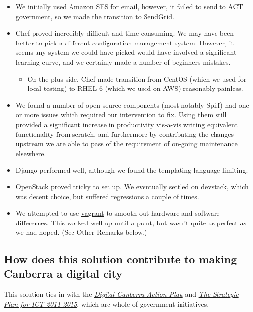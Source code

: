 \documentclass[12pt,a4paper,twosided]{article}
\begin{document}
\begin{itemize}

\item
  We initially used Amazon SES for email, however, it failed to send to
  ACT government, so we made the transition to SendGrid.
\item
  Chef proved incredibly difficult and time-consuming. We may have been
  better to pick a different configuration management system. However,
  it seems any system we could have picked would have involved a
  significant learning curve, and we certainly made a number of
  beginners mistakes.

  \begin{itemize}
  
  \item
    On the plus side, Chef made transition from CentOS (which we used
    for local testing) to RHEL 6 (which we used on AWS) reasonably
    painless.
  \end{itemize}
\item
  We found a number of open source components (most notably Spiff) had
  one or more issues which required our intervention to fix. Using them
  still provided a significant increase in productivity vis-a-vis
  writing equivalent functionality from scratch, and furthermore by
  contributing the changes upstream we are able to pass of the
  requirement of on-going maintenance elsewhere.
\item
  Django performed well, although we found the templating language
  limiting.
\item
  OpenStack proved tricky to set up. We eventually settled on
  \href{http://devstack.org/}{devstack}, which was decent choice, but
  suffered regressions a couple of times.
\item
  We attempted to use \href{http://www.vagrantup.com/}{vagrant} to
  smooth out hardware and software differences. This worked well up
  until a point, but wasn't quite as perfect as we had hoped. (See Other
  Remarks below.)
\end{itemize}

\subsection{How does this solution contribute to making Canberra a
digital city}

This solution ties in with the
\emph{\href{http://www.cmd.act.gov.au/policystrategic/digitalcanberra/actionplan}{Digital
Canberra Action Plan}} and
\emph{\href{http://www.cmd.act.gov.au/__data/assets/pdf_file/0011/247826/The_Strategic_Plan_for_ICT_2011-15.pdf}{The
Strategic Plan for ICT 2011-2015}}, which are whole-of-government
initiatives.
\end{document}
